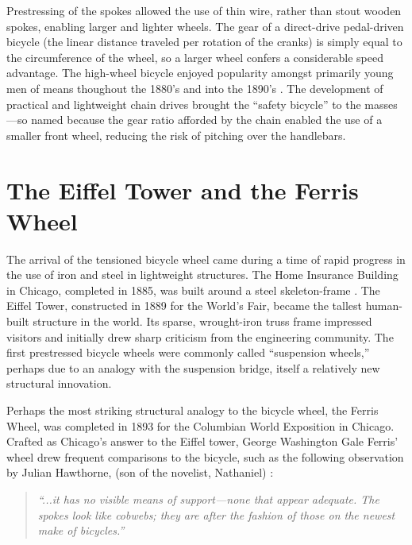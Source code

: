 \documentclass[../thesis.tex]{subfiles}
\begin{document}
Prestressing of the spokes allowed the use of thin wire, rather than stout wooden spokes, enabling larger and lighter wheels. The gear of a direct-drive pedal-driven bicycle (the linear distance traveled per rotation of the cranks) is simply equal to the circumference of the wheel, so a larger wheel confers a considerable speed advantage. The high-wheel bicycle enjoyed popularity amongst primarily young men of means thoughout the 1880's and into the 1890's \cite{SocialHistory}. The development of practical and lightweight chain drives brought the ``safety bicycle'' to the masses---so named because the gear ratio afforded by the chain enabled the use of a smaller front wheel, reducing the risk of pitching over the handlebars.

\section{The Eiffel Tower and the Ferris Wheel}

The arrival of the tensioned bicycle wheel came during a time of rapid progress in the use of iron and steel in lightweight structures. The Home Insurance Building in Chicago, completed in 1885, was built around a steel skeleton-frame \cite{something}. The Eiffel Tower, constructed in 1889 for the World's Fair, became the tallest human-built structure in the world. Its sparse, wrought-iron truss frame impressed visitors and initially drew sharp criticism from the engineering community\cite{something}. The first prestressed bicycle wheels were commonly called ``suspension wheels,'' perhaps due to an analogy with the suspension bridge, itself a relatively new structural innovation\cite{SciAm}.

Perhaps the most striking structural analogy to the bicycle wheel, the Ferris Wheel, was completed in 1893 for the Columbian World Exposition in Chicago\cite{something}. Crafted as Chicago's answer to the Eiffel tower, George Washington Gale Ferris' wheel drew frequent comparisons to the bicycle, such as the following observation by Julian Hawthorne, (son of the novelist, Nathaniel) \cite{Wiki:FerrisWheel}:

\begin{quote}
\emph{``...it has no visible means of support---none that appear adequate. The spokes look like cobwebs; they are after the fashion of those on the newest make of bicycles.''}
\end{quote}
\end{document}
